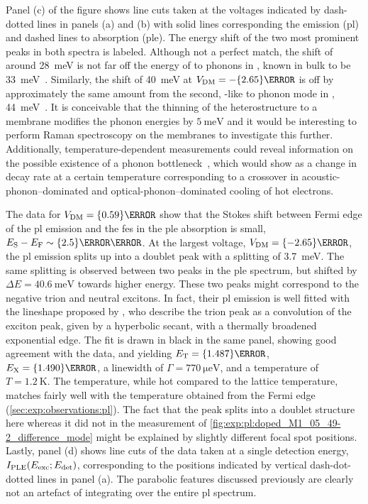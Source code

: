 Panel (c) of the figure shows line cuts taken at the voltages indicated by dash-dotted lines in panels (a) and (b) with solid lines corresponding the emission (\gls{pl}) and dashed lines to absorption (\gls{ple}).
The energy shift of the two most prominent peaks in both spectra is labeled.
Although not a perfect match, the shift of around \qty{28}{\milli\electronvolt} is not far off the energy of \gls{to} phonons in , known in bulk to be \qty{33}{\milli\electronvolt}~\cite{Strauch1990}.
Similarly, the shift of \qty{40}{\milli\electronvolt} at $\VDM=-\qty{2.65}{\volt}$ is off by approximately the same amount from the second, -like \gls{to} phonon mode in , \qty{44}{\milli\electronvolt}~\cite{Ilegems1970,Leng1989,Gammon1991}.
It is conceivable that the thinning of the heterostructure to a membrane modifies the phonon energies by $\qty{5}{\milli\electronvolt}$ and it would be interesting to perform Raman spectroscopy on the membranes to investigate this further.
Additionally, temperature-dependent measurements could reveal information on the possible existence of a phonon bottleneck~\cite{Murdin1997}, which would show as a change in decay rate at a certain temperature corresponding to a crossover in acoustic-phonon--dominated and optical-phonon--dominated cooling of hot electrons.

The data for $\VDM = \qty{0.59}{\volt}$ show that the Stokes shift between Fermi edge of the \gls{pl} emission and the \gls{fes} in the \gls{ple} absorption is small, $E_{\mr{S}} - E_{\mr{F}}\sim\qty{2.5}{\milli\electronvolt}$.
At the largest voltage, $\VDM = \qty{-2.65}{\volt}$, the \gls{pl} emission splits up into a doublet peak with a splitting of \qty{3.7}{\milli\electronvolt}.
The same splitting is observed between two peaks in the \gls{ple} spectrum, but shifted by $\Delta E = \qty{40.6}{\milli\electronvolt}$ towards higher energy.
These two peaks might correspond to the negative trion and neutral excitons.
In fact, their \gls{pl} emission is well fitted with the lineshape proposed by \citet{Esser2001}, who describe the trion peak as a convolution of the exciton peak, given by a hyperbolic secant, with a thermally broadened exponential edge.
The fit is drawn in black in the same panel, showing good agreement with the data, and yielding $E_{\mr{T}} = \qty{1.487}{\electronvolt}$, $E_{\mr{X}} = \qty{1.490}{\electronvolt}$, a linewidth of $\Gamma = \qty{770}{\micro\electronvolt}$, and a temperature of $T = \qty{1.2}{\kelvin}$.
The temperature, while hot compared to the lattice temperature, matches fairly well with the temperature obtained from the Fermi edge (\cref{sec:exp:observations:pl}).
The fact that the peak splits into a doublet structure here whereas it did not in the measurement of \cref{fig:exp:pl:doped_M1_05_49-2_difference_mode} might be explained by slightly different focal spot positions.
Lastly, panel (d) shows line cuts of the data taken at a single detection energy, $I_{\mathrm{PLE}}(E_{\mathrm{exc}}; E_{\mathrm{det}})$, corresponding to the positions indicated by vertical dash-dot-dotted lines in panel (a).
The parabolic features discussed previously are clearly not an artefact of integrating over the entire \gls{pl} spectrum.

